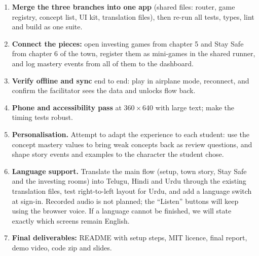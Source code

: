 \documentclass[10pt,a4paper]{article}
\begin{document}
\begin{enumerate}[label=\arabic*.]
  \item \textbf{Merge the three branches into one app} (shared files: router, game registry, concept list, UI kit, translation files), then re-run all tests, types, lint and build as one suite.
  \item \textbf{Connect the pieces:} open investing games from chapter 5 and Stay Safe from chapter 6 of the town, register them as mini-games in the shared runner, and log mastery events from all of them to the dashboard.
  \item \textbf{Verify offline and sync} end to end: play in airplane mode, reconnect, and confirm the facilitator sees the data and unlocks flow back.
  \item \textbf{Phone and accessibility pass} at 360\,$\times$\,640 with large text; make the timing tests robust.
  \item \textbf{Personalisation.} Attempt to adapt the experience to each student: use the concept mastery values to bring weak concepts back as review questions, and shape story events and examples to the character the student chose.
  \item \textbf{Language support.} Translate the main flow (setup, town story, Stay Safe and the investing rooms) into Telugu, Hindi and Urdu through the existing translation files, test right-to-left layout for Urdu, and add a language switch at sign-in. Recorded audio is not planned; the ``Listen'' buttons will keep using the browser voice. If a language cannot be finished, we will state exactly which screens remain English.
  \item \textbf{Final deliverables:} README with setup steps, MIT licence, final report, demo video, code zip and slides.
\end{enumerate}
\end{document}
